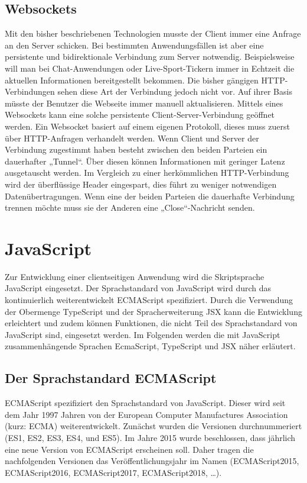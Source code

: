 \subsection{Websockets}

Mit den bisher beschriebenen Technologien musste der Client immer eine Anfrage an den Server schicken. Bei bestimmten Anwendungsfällen ist aber eine persistente und bidirektionale Verbindung zum Server notwendig. Beispielsweise will man bei Chat-Anwendungen oder Live-Sport-Tickern immer in Echtzeit die aktuellen Informationen bereitgestellt bekommen. Die bisher gängigen HTTP-Verbindungen sehen diese Art der Verbindung jedoch nicht vor. Auf ihrer Basis müsste der Benutzer die Webseite immer manuell aktualisieren. Mittels eines Websockets kann eine solche persistente Client-Server-Verbindung geöffnet werden. Ein Websocket basiert auf einem eigenen Protokoll, dieses muss zuerst über HTTP-Anfragen verhandelt werden. Wenn Client und Server der Verbindung zugestimmt haben besteht zwischen den beiden Parteien ein dauerhafter „Tunnel“. Über diesen können Informationen mit geringer Latenz ausgetauscht werden. Im Vergleich zu einer herkömmlichen HTTP-Verbindung wird der überflüssige Header eingespart, dies führt zu weniger notwendigen Datenübertragungen. Wenn eine der beiden Parteien die dauerhafte Verbindung trennen möchte muss sie der Anderen eine „Close“-Nachricht senden.\autocites[vgl.][11\psqq]{Fink2014}

\section{JavaScript}\label{sec:js}
Zur Entwicklung einer clientseitigen Anwendung wird die Skriptsprache JavaScript eingesetzt. Der Sprachstandard von JavaScript wird durch das  kontinuierlich weiterentwickelt ECMAScript spezifiziert. Durch die Verwendung der Obermenge TypeScript und der Spracherweiterung JSX kann die Entwicklung erleichtert und zudem können Funktionen, die nicht Teil des Sprachstandard von JavaScript sind, eingesetzt werden. Im Folgenden werden die mit JavaScript zusammenhängende Sprachen EcmaScript, TypeScript und JSX  näher erläutert.

\subsection{Der Sprachstandard ECMAScript}\label{sec:der-sprachstandard-ecmascript}
ECMAScript spezifiziert den Sprachstandard von JavaScript. Dieser wird seit dem Jahr 1997 Jahren von der European Computer Manufactures Association (kurz: ECMA) weiterentwickelt. Zunächst wurden die Versionen durchnummeriert (ES1, ES2, ES3, ES4, und ES5). Im Jahre 2015 wurde beschlossen, dass jährlich eine neue Version von ECMAScript erscheinen soll. Daher tragen die nachfolgenden Versionen das Veröffentlichungsjahr im Namen (ECMAScript2015, ECMAScript2016, ECMAScript2017, ECMAScript2018, …). 

